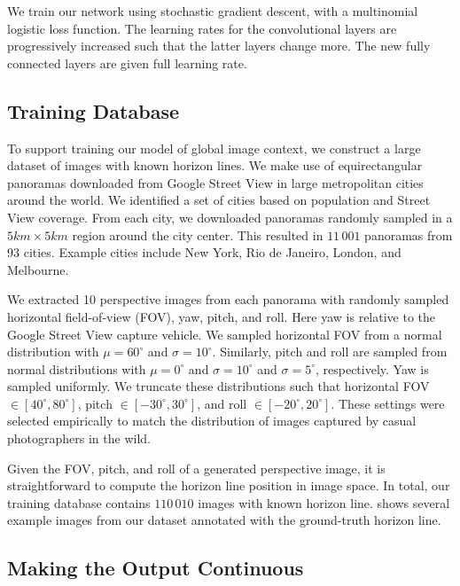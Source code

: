 We train our network using stochastic gradient descent, with a
multinomial logistic loss function. The learning rates for the
convolutional layers are progressively increased such that the latter
layers change more. The new fully connected layers are given full
learning rate.

\subsection{Training Database}
\label{sec:dataset}
To support training our model of global image context, we construct a
large dataset of images with known horizon lines. We make use of
equirectangular panoramas downloaded from Google Street View in large
metropolitan cities around the world. We identified a set of cities
based on population and Street View coverage. From each city, we
downloaded panoramas randomly sampled in a $5km \times 5km$ region
around the city center. This resulted in $11\,001$ panoramas from 93
cities. Example cities include New York, Rio de Janeiro, London, and
Melbourne.

We extracted 10 perspective images from each panorama with randomly
sampled horizontal field-of-view (FOV), yaw, pitch, and roll. Here yaw
is relative to the Google Street View capture vehicle. We sampled
horizontal FOV from a normal distribution with $\mu=60^\circ$ and
$\sigma=10^\circ$. Similarly, pitch and roll are sampled from normal
distributions with $\mu=0^\circ$ and $\sigma=10^\circ$ and
$\sigma=5^\circ$, respectively. Yaw is sampled uniformly.  We truncate
these distributions such that horizontal FOV $\in [40^\circ,
80^\circ]$, pitch $\in [-30^\circ, 30^\circ]$, and roll $\in
[-20^\circ, 20^\circ]$. These settings were selected empirically to
match the distribution of images captured by casual photographers in
the wild.

Given the FOV, pitch, and roll of a generated perspective image, it is
straightforward to compute the horizon line position in image space.
In total, our training database contains $110\,010$ images with known
horizon line.   shows several example images from
our dataset annotated with the ground-truth horizon line.

\subsection{Making the Output Continuous}

